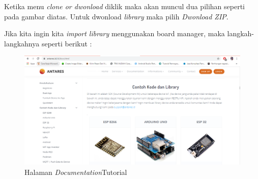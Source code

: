 \begin{enumerate}
     \par Ketika menu \textit{clone or dwonload} diklik maka akan muncul dua pilihan seperti pada gambar diatas. Untuk dwonload \textit{library} maka pilih \textit{Dwonload ZIP}.
     
     \par Jika kita ingin kita \textit{import library} menggunakan board manager, maka langkah-langkahnya seperti berikut :
     \begin{figure}[H]
    \centering
    \includegraphics[width=1\textwidth]{figures/antares12.png}
    \caption{Halaman \textit{Documentation}Tutorial}
    \label{print}
    \end{figure}
     

\end{enumerate}
